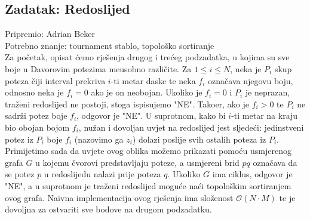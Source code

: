 \subsection*{Zadatak: Redoslijed}
\textsf{Pripremio: Adrian Beker}\\
\textsf{Potrebno znanje: tournament stablo, topološko sortiranje}\\

Za početak, opisat ćemo rješenja drugog i trećeg podzadatka, u kojima su sve
boje u Davorovim potezima me\dj usobno razli\v{c}ite. Za $1 \leq i \leq N$,
neka je $P_i$ skup poteza čiji interval prekriva $i$-ti metar daske te neka
$f_i$ označava njegovu boju, odnosno neka je $f_i = 0$ ako je on neobojan.
Ukoliko je $f_i = 0$ i $P_i$ je neprazan, traženi redoslijed ne postoji, stoga
ispisujemo "NE". Tako\dj er, ako je $f_i > 0$ te $P_i$ ne sadrži potez boje
$f_i$, odgovor je "NE". U suprotnom, kako bi $i$-ti metar na kraju bio obojan
bojom $f_i$, nužan i dovoljan uvjet na redoslijed jest sljedeći: jedinstveni
potez iz $P_i$ boje $f_i$ (nazovimo ga $z_i$) dolazi poslije svih ostalih
poteza iz $P_i$. Primijetimo sada da uvjete ovog oblika možemo prikazati pomoću
usmjerenog grafa $G$ u kojemu čvorovi predstavljaju poteze, a usmjereni brid
$pq$ označava da se potez $p$ u redoslijedu nalazi prije poteza $q$. Ukoliko
$G$ ima ciklus, odgovor je "NE", a u suprotnom je traženi redoslijed moguće
naći topološkim sortiranjem ovog grafa. Naivna implementacija ovog rješenja ima
složenost $\mathcal{O}(N \cdot M)$ te je dovoljna za ostvariti sve bodove na
drugom podzadatku.

